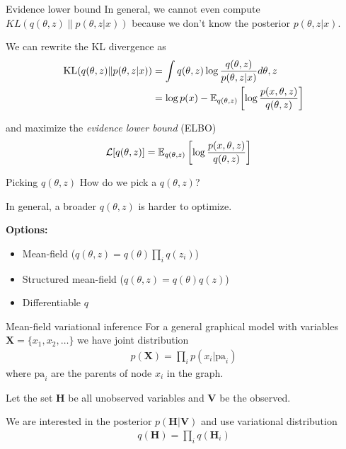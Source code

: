 \documentclass[10pt, compress]{beamer}
\begin{document}
\begin{frame}{Evidence lower bound}
  In general, we cannot even compute $KL(q(\theta, z)\|p(\theta, z | x))$
  because
  we don't know the posterior $p(\theta, z | x)$.

  \pause
  We can rewrite the KL divergence as
  \begin{align*}
    \textrm{KL}(q(\theta, z)\|p(\theta, z|x)) &= \int q(\theta, z)\log\frac{q(\theta, z)}{p(\theta, z | x)}d\theta, z \\
              &= \log p(x) - \mathbb{E}_{q(\theta, z)}\left[\log\frac{p(x, \theta, z)}{q(\theta, z)}\right]
  \end{align*}

  \pause
  and maximize the \emph{evidence lower bound} (ELBO)
  \begin{align*}
    \mathcal{L}[q(\theta, z)] &= \mathbb{E}_{q(\theta, z)}\left[\log\frac{p(x, \theta, z)}{q(\theta, z)}\right]
  \end{align*}
\end{frame}

\begin{frame}{Picking $q(\theta, z)$}
  How do we pick a $q(\theta, z)$?

  \pause

  In general, a broader $q(\theta, z)$ is harder to optimize.

  \textbf{Options:}
  \begin{itemize}
      \pause
    \item Mean-field ($q(\theta, z) = q(\theta)\prod_i q(z_i)$)
      \pause
    \item Structured mean-field ($q(\theta, z) = q(\theta)q(z)$)
      \pause
    \item Differentiable $q$
  \end{itemize}
\end{frame}

\begin{frame}{Mean-field variational inference}
  For a general graphical model
  with variables $\mathbf{X} = \{x_1, x_2, \ldots\}$
  we have joint distribution
  \begin{align*}
    p(\mathbf{X}) = \prod_i p(x_i | \textrm{pa}_i)
  \end{align*}
  where $\textrm{pa}_i$ are the parents of node $x_i$
  in the graph.


  \pause
  Let the set $\mathbf{H}$ be
  all unobserved variables and $\mathbf{V}$ be the observed.


  \pause
  We are interested in the posterior $p(\mathbf{H} | \mathbf{V})$
  and use variational distribution 
  \begin{align*}
    q(\mathbf{H}) = \prod_i q(\mathbf{H}_i)
  \end{align*}


\end{frame}
\end{document}
